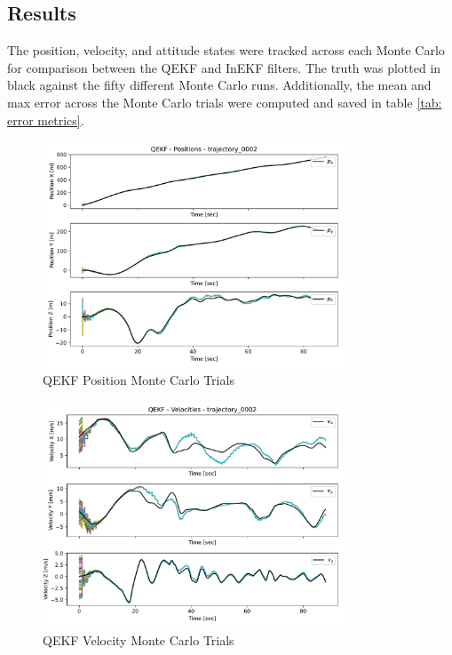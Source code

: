\subsection{Results}

The position, velocity, and attitude states were tracked across each Monte Carlo for comparison between the QEKF and InEKF filters. The truth was plotted in black against the fifty different Monte Carlo runs. Additionally, the mean and max error across the Monte Carlo trials were computed and saved in table \eqref{tab: error metrics}.

\begin{figure}[H]
    \centering
    \includegraphics[width=0.8\textwidth]{figs/QEKF_trajectory_0002_positions.pdf}
    \caption{QEKF Position Monte Carlo Trials}
    \label{fig: QEKF Position Monte Carlo Trials}
\end{figure}

\begin{figure}[H]
    \centering
    \includegraphics[width=0.8\textwidth]{figs/QEKF_trajectory_0002_velocities.pdf}
    \caption{QEKF Velocity Monte Carlo Trials}
    \label{fig: QEKF Velocity Monte Carlo Trials}
\end{figure}

